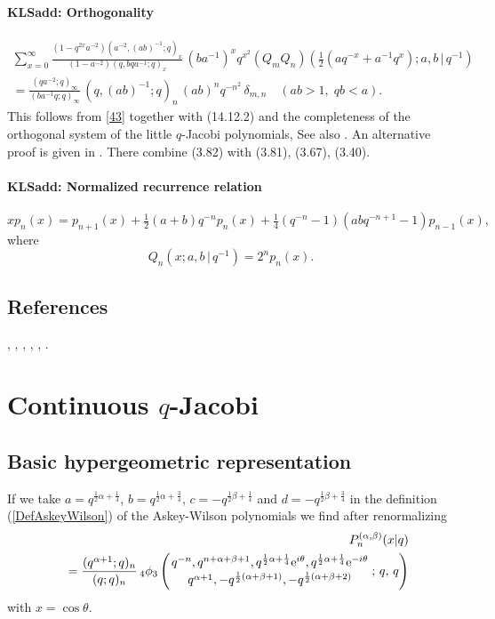 \documentclass[envcountchap,graybox]{svmono}
\newcounter{rom}
\newcommand{\qhyp}[5]{\mbox{}_{#1}{\phi}_{#2}
\left(\genfrac{}{}{0pt}{}{#3}{#4}\,;\,q,\,#5\right)}
\newcommand{\e}{\textrm{e}}
\newcommand\de\delta
\newcommand\thalf{\tfrac12}
\newcommand\iy\infty
\newcommand{\qhyp}[5]{\,\mbox{}_{#1}\phi_{#2}\!\left(
  \genfrac{}{}{0pt}{}{#3}{#4};#5\right)}
\begin{document}
\paragraph{\large\bf KLSadd: Orthogonality}%
\begin{multline}
\sum_{x=0}^\iy
\frac{(1-q^{2x}a^{-2}) (a^{-2},(ab)^{-1};q)_x}
{(1-a^{-2}) (q,bqa^{-1};q)_x}\,
(ba^{-1})^xq^{x^2}
(Q_mQ_n)(\thalf(aq^{-x}+a^{-1}q^x);a,b\,|\, q^{-1})\\
=\frac{(qa^{-2};q)_\iy}{(ba^{-1}q;q)_\iy}\,
(q,(ab)^{-1};q)_n\,(ab)^nq^{-n^2}\,\de_{m,n}
\quad(ab>1,\;qb<a).
\label{21}
\end{multline}
%
This follows from \eqref{43} together with (14.12.2) and the completeness of
the orthogonal system of the little $q$-Jacobi polynomials,
See also . An alternative proof is given in
. There combine (3.82) with (3.81), (3.67), (3.40).
%
\paragraph{\large\bf KLSadd: Normalized recurrence relation}%
\begin{equation}
xp_n(x)=p_{n+1}(x)+\thalf(a+b)q^{-n} p_n(x)+
\tfrac14(q^{-n}-1)(abq^{-n+1}-1)p_{n-1}(x),
\label{22}
\end{equation}
%
where
\[
Q_n(x;a,b\,|\, q^{-1})=2^n p_n(x).
\]
%

\subsection*{References}
\cite{AlSalam90}, \cite{AlSalamChihara87}, \cite{AskeyIsmail84},
\cite{AskeyWilson85}, \cite{CharrisIsmail}, \cite{Ismail85II}.


\section{Continuous $q$-Jacobi}
\par\setcounter{equation}{0}

\subsection*{Basic hypergeometric representation} If we take $a=q^{\frac{1}{2}\alpha+\frac{1}{4}}$, $b=q^{\frac{1}{2}\alpha+\frac{3}{4}}$,
$c=-q^{\frac{1}{2}\beta+\frac{1}{4}}$ and $d=-q^{\frac{1}{2}\beta+\frac{3}{4}}$ in
the definition (\ref{DefAskeyWilson}) of the Askey-Wilson polynomials we find
after renormalizing
\begin{eqnarray}
\label{DefContqJacobi}
& &P_n^{(\alpha,\beta)}(x|q)\nonumber\\
& &{}=\frac{(q^{\alpha+1};q)_n}{(q;q)_n}\,
\qhyp{4}{3}{q^{-n},q^{n+\alpha+\beta+1},q^{\frac{1}{2}\alpha+\frac{1}{4}}\e^{i\theta},q^{\frac{1}{2}\alpha+\frac{1}{4}}\e^{-i\theta}}
{q^{\alpha+1},-q^{\frac{1}{2}(\alpha+\beta+1)},-q^{\frac{1}{2}(\alpha+\beta+2)}}{q}
\end{eqnarray}
with $x=\cos\theta$.
\end{document}
